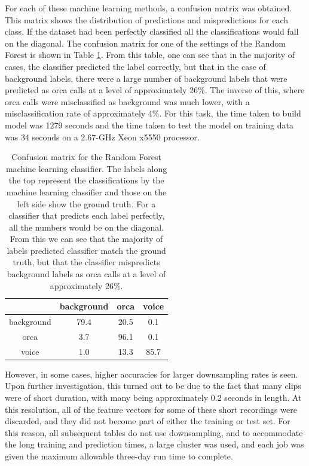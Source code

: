 \documentclass[12pt,oneside]{book}
\begin{document}
For each of these machine learning methods, a confusion matrix was
obtained. This matrix shows the distribution of predictions and
mispredictions for each class. If the dataset had been perfectly
classified all the classifications would fall on the diagonal.  The
confusion matrix for one of the settings of the Random Forest is shown
in Table \ref{table:OBVConfusionMatrix}.  From this table, one can see
that in the majority of cases, the classifier predicted the label
correctly, but that in the case of background labels, there were a
large number of background labels that were predicted as orca calls at
a level of approximately 26\%.  The inverse of this, where orca calls
were misclassified as background was much lower, with a
misclassification rate of approximately 4\%.  For this task, the time
taken to build model was 1279 seconds and the time taken to test the
model on training data was 34 seconds on a 2.67-GHz Xeon x5550
processor.

\begin{table}
\begin{tabular}{|c|c|c|c|}
\hline
           & background & orca & voice \\
\hline
background & 79.4 &  20.5  &  0.1      \\
orca       & 3.7  &  96.1  &  0.1      \\
voice      & 1.0  &  13.3  &  85.7     \\
\hline
\end{tabular}
\caption{Confusion matrix for the Random Forest machine
  learning classifier.  The labels along the top represent the
  classifications by the machine learning classifier and those on the
  left side show the ground truth.  For a classifier that predicts
  each label perfectly, all the numbers would be on the diagonal. From
  this we can see that the majority of labels predicted classifier
  match the ground truth, but that the classifier mispredicts
  background labels as orca calls at a level of approximately 26\%.  }
\label{table:OBVConfusionMatrix}
\end{table}

However, in some cases, higher accuracies for larger downsampling
rates is seen.  Upon further investigation, this turned out to be due
to the fact that many clips were of short duration, with many being
approximately 0.2 seconds in length.  At this resolution, all of the
feature vectors for some of these short recordings were discarded, and
they did not become part of either the training or test set.  For this
reason, all subsequent tables do not use downsampling, and to
accommodate the long training and prediction times, a large cluster
was used, and each job was given the maximum allowable three-day run
time to complete.
\end{document}

